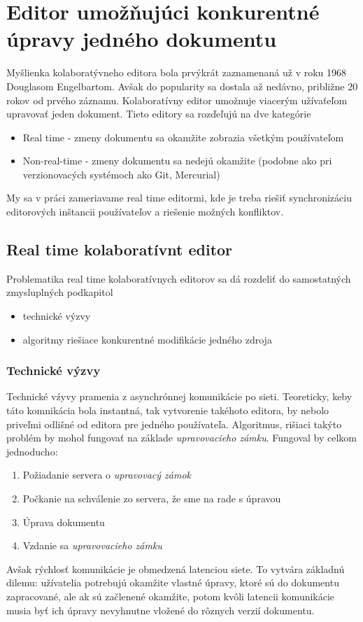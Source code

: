 \chapter{Editor umožňujúci konkurentné úpravy jedného dokumentu}

\label{kap:zdialtelnost} %

Myšlienka kolaboratývneho editora bola prvýkrát zaznamenaná už v roku 1968 Douglasom Engelbartom. 
Avšak do popularity sa dostala až nedávno, približne 20 rokov od prvého záznamu.
Kolaboratívny editor umožnuje viacerým užívaťeľom upravovať jeden dokument.
Tieto editory sa rozďeľujú na dve kategórie
\begin{itemize}
  \item Real time - zmeny dokumentu sa okamžite zobrazia všetkým používateľom
  \item Non-real-time - zmeny dokumentu sa nedejú okamžite (podobne ako pri verzionovacých
  systémoch ako Git, Mercurial)
\end{itemize}
My sa v práci zameriavame real time editormi, kde je treba riešiť synchronizáciu editorových
inštancii používateľov a riešenie možných konfliktov.

\section{Real time kolaboratívnt editor}
Problematika real time kolaboratívnych editorov sa dá rozdeliť do samostatných zmysluplných 
podkapitol
\begin{itemize}
\item  technické výzvy
\item  algoritmy riešiace konkurentné modifikácie jedného zdroja
\end{itemize}

\subsection{Technické výzvy}
Technické vźyvy pramenia z asynchrónnej komunikácie po sieti. Teoreticky, keby táto 
komnikácia bola instantná, tak vytvorenie takéhoto editora, by nebolo priveľmi odlišné od
editora pre jedného používateľa. Algoritmus, rišiaci takýto problém by mohol fungovať na 
základe \textit{upravovacieho zámku}. Fungoval by celkom jednoducho:
\begin{enumerate}
  \item Požiadanie servera o \textit{upravovacý zámok}
  \item Počkanie na schválenie zo servera, že sme na rade s úpravou
  \item Úprava dokumentu
  \item Vzdanie sa \textit{upravovacieho zámku}
\end{enumerate}
Avšak rýchlosť komunikácie je obmedzená latenciou siete. To vytvára základnú dilemu: 
užívatelia potrebujú okamžite vlastné úpravy, ktoré sú do dokumentu zapracované,
ale ak sú začlenené okamžite, potom kvôli latencii komunikácie musia byť ich
úpravy nevyhnutne vložené do rôznych verzií dokumentu.

